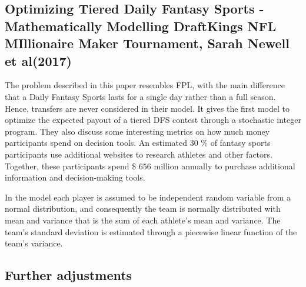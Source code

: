 \subsection{Optimizing Tiered Daily Fantasy Sports - Mathematically Modelling DraftKings NFL MIllionaire Maker Tournament, Sarah Newell et al(2017)}

The problem described in this paper resembles FPL, with the main difference that a Daily Fantasy Sports lasts for a single day rather than a full season. Hence, transfers are never considered in their model. It gives the first model to optimize the expected payout of a tiered DFS contest through a stochastic integer program. They also discuss some interesting metrics on how much money participants spend on decision tools. An estimated 30 \% of fantasy sports participants use additional websites to research athletes and other factors. Together, these participants spend \$ $656$ million annually to purchase additional information and decision-making tools. 

\newpar

In the model each player is assumed to be independent random variable from a normal distribution, and consequently the team is normally distributed with mean and variance that is the sum of each athlete's mean and variance. The team's standard deviation is estimated through a piecewise linear function of the team's variance. 
\begin{comment}
INSPO: 
Approximately 56.8 million people worldwide played fantasy sports in 2015 [1]. The fantasy sports industry is
expected to grow annually by 41%
participants has impacted the sports industry positively, as research shows that fantasy sport participation increases
game attendance and sports media viewership [3].
\end{comment}


\subsection{Further adjustments}


